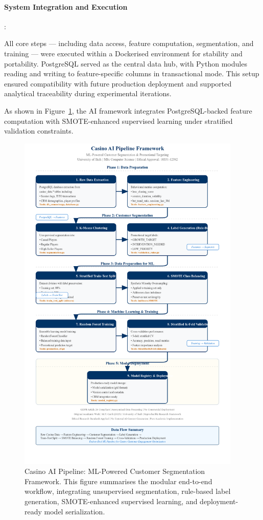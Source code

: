 \documentclass[12pt,a4paper]{report}
\begin{document}
\paragraph{System Integration and Execution}:

All core steps — including data access, feature computation, segmentation, and training — were executed within a Dockerised environment for stability and portability. PostgreSQL served as the central data hub, with Python modules reading and writing to feature-specific columns in transactional mode. This setup ensured compatibility with future production deployment and supported analytical traceability during experimental iterations.

As shown in Figure~\ref{fig:casino2_pipeline}, the AI framework integrates PostgreSQL-backed feature computation with SMOTE-enhanced supervised learning under stratified validation constraints.


\begin{figure}[H]
    \centering
    \includegraphics[width=0.95\textwidth]{figures/casino2_pipeline.png}
    \caption{Casino AI Pipeline: ML-Powered Customer Segmentation Framework. This figure summarises the modular end-to-end workflow, integrating unsupervised segmentation, rule-based label generation, SMOTE-enhanced supervised learning, and deployment-ready model serialization.}
    \label{fig:casino2_pipeline}
\end{figure}
\end{document}
